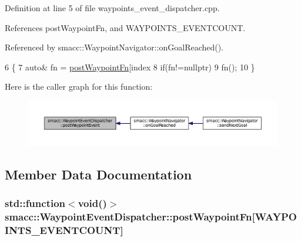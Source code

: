Definition at line 5 of file waypoints\+\_\+event\+\_\+dispatcher.\+cpp.



References post\+Waypoint\+Fn, and W\+A\+Y\+P\+O\+I\+N\+T\+S\+\_\+\+E\+V\+E\+N\+T\+C\+O\+U\+NT.



Referenced by smacc\+::\+Waypoint\+Navigator\+::on\+Goal\+Reached().


\begin{DoxyCode}
6 \{
7     \textcolor{keyword}{auto}& fn = \hyperlink{classsmacc_1_1WaypointEventDispatcher_a6bccf6a93a827634b7b5e67ac0e4ec57}{postWaypointFn}[index %
8     \textcolor{keywordflow}{if}(fn!=\textcolor{keyword}{nullptr})
9         fn();
10 \}
\end{DoxyCode}


Here is the caller graph for this function\+:
\nopagebreak
\begin{figure}[H]
\begin{center}
\leavevmode
\includegraphics[width=350pt]{classsmacc_1_1WaypointEventDispatcher_a6bd85034cb55795930741301a6077fe5_icgraph}
\end{center}
\end{figure}




\subsection{Member Data Documentation}
\subsubsection[{\texorpdfstring{post\+Waypoint\+Fn}{postWaypointFn}}]{\setlength{\rightskip}{0pt plus 5cm}std\+::function$<$void()$>$ smacc\+::\+Waypoint\+Event\+Dispatcher\+::post\+Waypoint\+Fn\mbox{[}{\bf W\+A\+Y\+P\+O\+I\+N\+T\+S\+\_\+\+E\+V\+E\+N\+T\+C\+O\+U\+NT}\mbox{]}\hspace{0.3cm}{\ttfamily [private]}}\hypertarget{classsmacc_1_1WaypointEventDispatcher_a6bccf6a93a827634b7b5e67ac0e4ec57}{}\label{classsmacc_1_1WaypointEventDispatcher_a6bccf6a93a827634b7b5e67ac0e4ec57}


